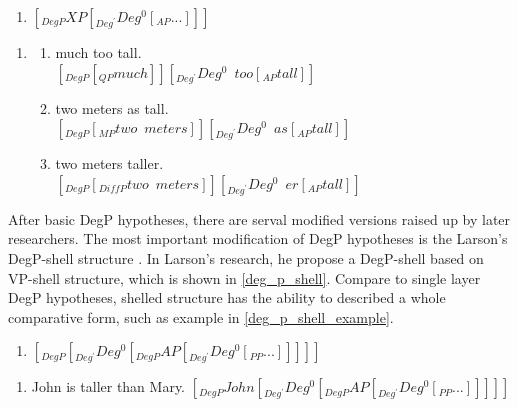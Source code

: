 \documentclass{ctexart}
\let \cite \parencite
\begin{document}
\begin{enumerate}[resume]
    \item \label{abney_deg_p} $[_{DegP} XP [_{Deg^{\prime}}Deg^0[_{AP}...]]] $
\end{enumerate}

\begin{enumerate}[resume]
    \item \label{abney_deg_p_example}
    \begin{enumerate}[ref=(\arabic{enumi}\alph*)]
        \item \label{abney_deg_p_example_1}
        much too tall.\\
        $[_{DegP} [_{QP} much]] [_{Deg^{\prime}}Deg^0 \enspace too [_{AP}tall]] $
        \item \label{abney_deg_p_example_2}
        two meters as tall.\\
        $[_{DegP} [_{MP} two \enspace meters]] [_{Deg^{\prime}}Deg^0 \enspace as [_{AP}tall]] $
        \item \label{abney_deg_p_example_3}
        two meters taller.\\
        $[_{DegP} [_{DiffP} two \enspace meters]] [_{Deg^{\prime}}Deg^0 \enspace er [_{AP}tall]] $

    \end{enumerate}
\end{enumerate}

After basic DegP hypotheses, there are serval modified versions raised up by later researchers. The most important modification of DegP hypotheses is the Larson's DegP-shell structure \cite{larson1991}. In Larson's research, he propose a DegP-shell based on VP-shell structure, which is shown in \ref{deg_p_shell}. Compare to single layer DegP hypotheses, shelled structure has the ability to described a whole comparative form, such as example in \ref{deg_p_shell_example}.

\begin{enumerate}[resume]
    \item \label{deg_p_shell} $[_{DegP} [_{Deg^{\prime}} Deg^0 [_{DegP} AP [_{Deg^{\prime}} Deg^0 [_{PP}...]]]]] $
\end{enumerate}

\begin{enumerate}[resume]
    \item \label{deg_p_shell_example} 
    John is taller than Mary.
    $[_{DegP} John [_{Deg^{\prime}} Deg^0 [_{DegP} AP [_{Deg^{\prime}} Deg^0 [_{PP}...]]]]] $
\end{enumerate}
\end{document}
